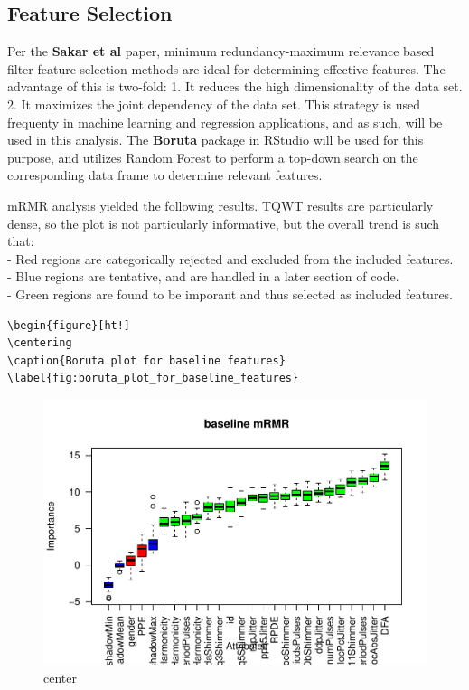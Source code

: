 \documentclass[
]{article}
\begin{document}
\hypertarget{feature-selection}{%
\subsection{Feature Selection}\label{feature-selection}}

Per the \textbf{Sakar et al} paper, minimum redundancy-maximum relevance based filter feature selection methods are ideal for determining effective features. The advantage of this is two-fold:
1. It reduces the high dimensionality of the data set.
2. It maximizes the joint dependency of the data set.
This strategy is used frequenty in machine learning and regression applications, and as such, will be used in this analysis. The \textbf{Boruta} package in RStudio will be used for this purpose, and utilizes Random Forest to perform a top-down search on the corresponding data frame to determine relevant features.

mRMR analysis yielded the following results. TQWT results are particularly dense, so the plot is not particularly informative, but the overall trend is such that:\\
- Red regions are categorically rejected and excluded from the included features.\\
- Blue regions are tentative, and are handled in a later section of code.\\
- Green regions are found to be imporant and thus selected as included features.

\begin{verbatim}
\begin{figure}[ht!]
\centering
\caption{Boruta plot for baseline features}
\label{fig:boruta_plot_for_baseline_features}
\end{verbatim}

\begin{figure}
\includegraphics[width=1\linewidth,height=1\textheight]{figure/unnamed-chunk-7-1} \caption{center}\label{fig:unnamed-chunk-7-1}
\end{figure}
\end{document}
